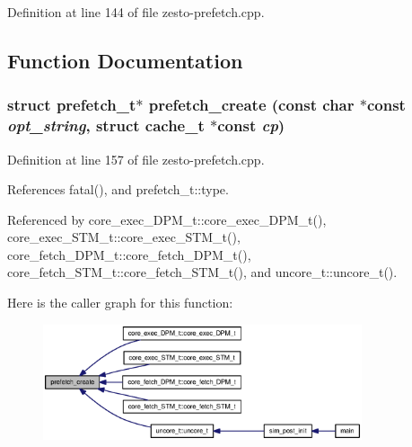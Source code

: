 Definition at line 144 of file zesto-prefetch.cpp.

\subsection{Function Documentation}
\subsubsection[{prefetch\_\-create}]{\setlength{\rightskip}{0pt plus 5cm}struct {\bf prefetch\_\-t}$\ast$ prefetch\_\-create (const char $\ast$const  {\em opt\_\-string}, \/  struct {\bf cache\_\-t} $\ast$const  {\em cp})\hspace{0.3cm}{\tt  [read]}}\label{zesto-prefetch_8cpp_3d85e6268083839e3f4f31e038f204a8}




Definition at line 157 of file zesto-prefetch.cpp.

References fatal(), and prefetch\_\-t::type.

Referenced by core\_\-exec\_\-DPM\_\-t::core\_\-exec\_\-DPM\_\-t(), core\_\-exec\_\-STM\_\-t::core\_\-exec\_\-STM\_\-t(), core\_\-fetch\_\-DPM\_\-t::core\_\-fetch\_\-DPM\_\-t(), core\_\-fetch\_\-STM\_\-t::core\_\-fetch\_\-STM\_\-t(), and uncore\_\-t::uncore\_\-t().

Here is the caller graph for this function:\nopagebreak
\begin{figure}[H]
\begin{center}
\leavevmode
\includegraphics[width=266pt]{zesto-prefetch_8cpp_3d85e6268083839e3f4f31e038f204a8_icgraph}
\end{center}
\end{figure}
